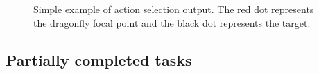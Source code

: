 \documentclass[a4paper,11pt]{article}
\begin{document}
\begin{figure}[h]
\begin{minipage}{0.2\textwidth}
\end{minipage}
\begin{minipage}{0.2\textwidth}
\end{minipage}
\caption{Simple example of action selection output. The red dot represents the dragonfly focal point and the black dot represents the target.}
\label{target_animation_example}
\end{figure}
\subsection{Partially completed tasks}
\end{document}

